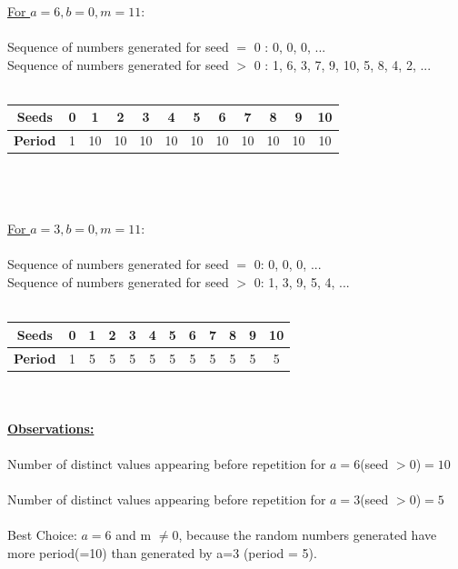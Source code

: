 \documentclass[11pt]{article}
\begin{document}
\underline{For  $a=6,b=0,m=11:$}\\\\
Sequence of numbers generated for seed $=$ 0 : 0, 0, 0, ...\\
Sequence of numbers generated for seed $>$ 0 : 1, 6, 3, 7, 9, 10, 5, 8, 4, 2, ...\\\\
\begin{tabular}{|c|c|c|c|c|c|c|c|c|c|c|c|}
\hline 
\textbf{Seeds} & 0 & 1 & 2 & 3 & 4 & 5 & 6 & 7 & 8 & 9 & 10 \\
\hline
\textbf{Period} & 1 & 10 & 10 & 10 & 10 & 10 & 10 & 10 & 10 & 10 &10\\
\hline
\end{tabular}\\\\
\\\underline{For  $a=3,b=0,m=11:$}\\\\
Sequence of numbers generated for seed $=$ 0: 0, 0, 0, ...\\
Sequence of numbers generated for seed $>$ 0: 1, 3, 9, 5, 4, ...\\\\
\begin{tabular}{|c|c|c|c|c|c|c|c|c|c|c|c|}
\hline 
\textbf{Seeds} & 0 & 1 & 2 & 3 & 4 & 5 & 6 & 7 & 8 & 9 & 10 \\
\hline
\textbf{Period} & 1 & 5 & 5 & 5 & 5 & 5 & 5 & 5 & 5 & 5 &5\\
\hline
\end{tabular}
\\\\\textbf{\underline{Observations:}}\\\\
Number of distinct values appearing before repetition for $a=6$(seed $>0$)$=10$\\\\
Number of distinct values appearing before repetition for $a=3$(seed $>0$)$=5$\\\\
Best Choice: $a=6$ and m $\neq 0 $, because the random numbers generated have more period(=10) than generated by a=3 (period = 5).\\
\pagebreak
\end{document}
